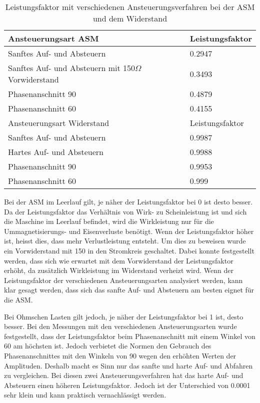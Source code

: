 \begin{table}[ht!]
	\centering
	\begin{tabular}{|l|l|}
		\hline
		Ansteuerungsart ASM                                   		& Leistungsfaktor \\ \hline 
		Sanftes Auf- und Absteuern                          		& 0.2947          \\ \hline
		Sanftes Auf- und Absteuern mit 150$\Omega$ Vorwiderstand 	& 0.3493          \\ \hline
		Phasenanschnitt 90\textdegree                               & 0.4879          \\ \hline
		Phasenanschnitt 60\textdegree                               & 0.4155          \\ \hline \hline
		Ansteuerungsart Widerstand                            		& Leistungsfaktor \\ \hline 
		Sanftes Auf- und Absteuern                          		& 0.9987          \\ \hline
		Hartes Auf- und Absteuern                                   & 0.9988          \\ \hline
		Phasenanschnitt 90\textdegree                         		& 0.9953          \\ \hline
		Phasenanschnitt 60\textdegree                         		& 0.999           \\ \hline
	\end{tabular}
\caption{Leistungsfaktor mit verschiedenen Ansteuerungsverfahren bei der ASM und dem Widerstand}\label{tab:Leistungsfaktor_ASM_Widerstand}
\end{table}
Bei der ASM im Leerlauf gilt, je näher der Leistungsfaktor bei 0 ist desto besser. Da der Leistungsfaktor das Verhältnis von Wirk- zu Scheinleistung ist und sich die Maschine im Leerlauf befindet, wird die Wirkleistung nur für die Ummagnetisierungs- und Eisenverluste benötigt. Wenn der Leistungsfaktor höher ist, heisst dies, dass mehr Verlustleistung entsteht. Um dies zu beweisen wurde ein Vorwiderstand mit \SI{150}{\Omega} in den Stromkreis geschaltet. Dabei konnte festgestellt werden, dass sich wie erwartet mit dem Vorwiderstand der Leistungsfaktor erhöht, da zusätzlich Wirkleistung im Widerstand verheizt wird. Wenn der Leistungsfaktor der verschiedenen Ansteuerungsarten analysiert werden, kann klar gesagt werden, dass sich das sanfte Auf- und  Absteuern am besten eignet für die ASM.

Bei Ohmschen Lasten gilt jedoch, je näher der Leistungsfaktor bei 1 ist, desto besser. Bei den Messungen mit den verschiedenen Ansteuerungsarten wurde festgestellt, dass der Leistungsfaktor beim Phasenanschnitt mit einem Winkel von 60\textdegree \hspace{0.02cm} am höchsten ist. Jedoch verbietet die Normen den Gebrauch des Phasenanschnittes mit den Winkeln von 90\textdegree \hspace{0.02cm} wegen den erhöhten Werten der Amplituden. Deshalb macht es Sinn nur das sanfte und harte Auf- und Abfahren zu vergleichen. Bei diesen zwei Ansteuerungsverfahren hat das harte Auf- und Absteuern einen höheren Leistungsfaktor. Jedoch ist der Unterschied von 0.0001 sehr klein und kann praktisch vernachlässigt werden.
 



